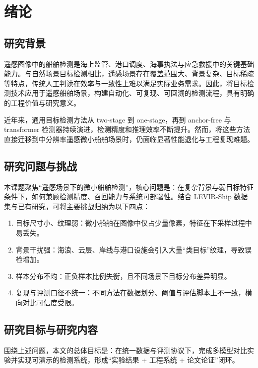 \chapter{绪论}
\label{ch:intro}

\section{研究背景}

遥感图像中的船舶检测是海上监管、港口调度、海事执法与应急救援中的关键基础能力。与自然场景目标检测相比，遥感场景存在覆盖范围大、背景复杂、目标稀疏等特点，传统人工判读在效率与一致性上难以满足实际业务需求。因此，将目标检测技术应用于遥感船舶场景，构建自动化、可复现、可回溯的检测流程，具有明确的工程价值与研究意义。

近年来，通用目标检测方法从 two-stage 到 one-stage，再到 anchor-free 与 transformer 检测器持续演进，检测精度和推理效率不断提升\cite{ren2015_fasterrcnn,lin2017_fpn,lin2017_focalloss,tian2019_fcos,redmon2016_yolo,carion2020_detr,zhu2021_deformabledetr}。然而，将这些方法直接迁移到中分辨率遥感微小船舶场景时，仍面临显著性能退化与工程复现难题。

\section{研究问题与挑战}

本课题聚焦“遥感场景下的微小船舶检测”，核心问题是：在复杂背景与弱目标特征条件下，如何兼顾检测精度、召回能力与系统可部署性。结合 LEVIR-Ship 数据集与已有研究\cite{chen2022_tinyship_drenet,levirship2021_dataset}，可将主要挑战归纳为以下四点：

\begin{enumerate}
  \item 目标尺寸小、纹理弱：微小船舶在图像中仅占少量像素，特征在下采样过程中易丢失。
  \item 背景干扰强：海浪、云层、岸线与港口设施会引入大量“类目标”纹理，导致误检增加。
  \item 样本分布不均：正负样本比例失衡，且不同场景下目标分布差异明显。
  \item 复现与评测口径不统一：不同方法在数据划分、阈值与评估脚本上不一致，横向对比可信度受限。
\end{enumerate}

\section{研究目标与研究内容}

围绕上述问题，本文的总体目标是：在统一数据与评测协议下，完成多模型对比实验并实现可演示的检测系统，形成“实验结果 + 工程系统 + 论文论证”闭环。


